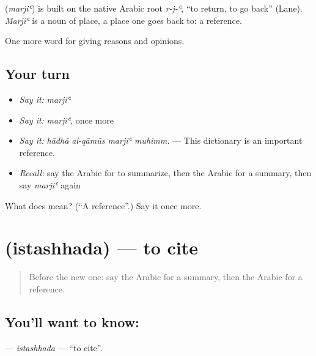 \begin{cousinweb}
\textbf{} (\emph{marjiʿ}) is built on the native Arabic root \emph{r-j-ʿ}, \textquotedblleft{}to return, to go back\textquotedblright{} (Lane). \emph{Marjiʿ} is a noun of place, a place one goes back to: a reference.
\end{cousinweb}

\begin{grammarlens}[title={What you've built}]
One more word for giving reasons and opinions.
\end{grammarlens}

\subsection*{Your turn}
\begin{itemize}
\raggedright
  \item \emph{Say it:} \emph{marjiʿ}
  \item \emph{Say it:} \emph{marjiʿ}, once more
  \item \emph{Say it:} \emph{hādhā al-qāmūs marjiʿ muhimm.} — This dictionary is an important reference.
  \item \emph{Recall:} say the Arabic for to summarize, then the Arabic for a summary, then say \emph{marjiʿ} again
\end{itemize}

\begin{tcolorbox}[breakable,colback=teal!4,colframe=teal!35!black,title={Before you move on}]
What does  mean? (\textquotedblleft{}A reference\textquotedblright{}.) Say it once more.
\end{tcolorbox}
\section[\texorpdfstring{\ar{استشهد} (istashhada)}{استشهد (istashhada)}]{ (istashhada) — to cite}

\label{lesson:AR-C395-istashhada}



\begin{quote}
Before the new one: say the Arabic for a summary, then the Arabic for a reference.
\end{quote}

\subsection*{You'll want to know: }
\textbf{} — \emph{istashhada} — \textquotedblleft{}to cite\textquotedblright{}.

